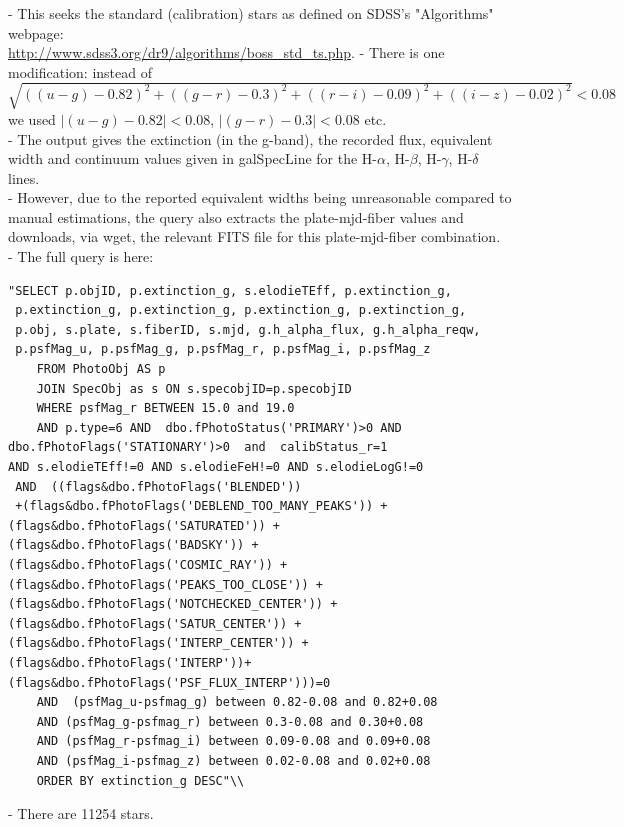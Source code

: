 \documentclass[preprint]{aastex}
\begin{document}
- This seeks the standard (calibration) stars as defined on SDSS's "Algorithms" webpage:\\  \url{http://www.sdss3.org/dr9/algorithms/boss\_std\_ts.php}. 
- There is one modification: instead of \\ $\sqrt{((u-g)-0.82)^2+((g-r)-0.3)^2+((r-i)-0.09)^2+((i-z)-0.02)^2}<0.08$ we used $|(u-g)-0.82|<0.08$, $|(g-r)-0.3|<0.08$ etc. \\
- The output gives the extinction (in the g-band), the recorded flux, equivalent width and continuum values given in galSpecLine for the H-$\alpha$, H-$\beta$, H-$\gamma$, H-$\delta$ lines. \\
- However, due to the reported equivalent widths being unreasonable compared to manual estimations, the query also extracts the plate-mjd-fiber values and downloads, via wget, the relevant FITS file for this plate-mjd-fiber combination. \\
- The full query is here: 
\begin{verbatim}"SELECT p.objID, p.extinction_g, s.elodieTEff, p.extinction_g,
 p.extinction_g, p.extinction_g, p.extinction_g, p.extinction_g,
 p.obj, s.plate, s.fiberID, s.mjd, g.h_alpha_flux, g.h_alpha_reqw, 
 p.psfMag_u, p.psfMag_g, p.psfMag_r, p.psfMag_i, p.psfMag_z 
    FROM PhotoObj AS p 
    JOIN SpecObj as s ON s.specobjID=p.specobjID 
    WHERE psfMag_r BETWEEN 15.0 and 19.0 
    AND p.type=6 AND  dbo.fPhotoStatus('PRIMARY')>0 AND 
dbo.fPhotoFlags('STATIONARY')>0  and  calibStatus_r=1 
AND s.elodieTEff!=0 AND s.elodieFeH!=0 AND s.elodieLogG!=0 
 AND  ((flags&dbo.fPhotoFlags('BLENDED')) 
 +(flags&dbo.fPhotoFlags('DEBLEND_TOO_MANY_PEAKS')) +   
(flags&dbo.fPhotoFlags('SATURATED')) +
(flags&dbo.fPhotoFlags('BADSKY')) + 
(flags&dbo.fPhotoFlags('COSMIC_RAY')) +
(flags&dbo.fPhotoFlags('PEAKS_TOO_CLOSE')) +   
(flags&dbo.fPhotoFlags('NOTCHECKED_CENTER')) +
(flags&dbo.fPhotoFlags('SATUR_CENTER')) +  
(flags&dbo.fPhotoFlags('INTERP_CENTER')) +
(flags&dbo.fPhotoFlags('INTERP'))+  
(flags&dbo.fPhotoFlags('PSF_FLUX_INTERP')))=0 
    AND  (psfMag_u-psfmag_g) between 0.82-0.08 and 0.82+0.08 
    AND (psfMag_g-psfmag_r) between 0.3-0.08 and 0.30+0.08 
    AND (psfMag_r-psfmag_i) between 0.09-0.08 and 0.09+0.08 
    AND (psfMag_i-psfmag_z) between 0.02-0.08 and 0.02+0.08 
    ORDER BY extinction_g DESC"\\
\end{verbatim}
- There are 11254 stars.
\end{document}
